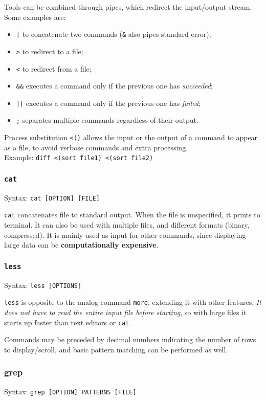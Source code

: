Tools can be combined through pipes, which redirect the input/output stream. Some examples are:
\begin{itemize}
	\item \texttt{|} to concatenate two commands (\texttt{\&} also pipes standard error);
	\item \texttt{>} to redirect to a file;
	\item \texttt{<} to redirect from a file;
	\item \texttt{\&\&} executes a command only if the previous one has \textit{succeeded};
	\item \texttt{||} executes a command only if the previous one has \textit{failed};
	\item \texttt{;} separates multiple commands regardless of their output.
\end{itemize}

Process substitution \texttt{<()} allows the input or the output of a command to appear as a file, to avoid verbose commands and extra processing. \\
Example: \texttt{diff <(sort file1) <(sort file2)}

\subsubsection{\texttt{cat}}
Syntax: \texttt{cat [OPTION] [FILE]}

\texttt{cat} concatenates file to standard output. When the file is unspecified, it prints to terminal. It can also be used with multiple files, and different formats (binary, compressed). It is mainly used as input for other commands, since displaying large data can be \textbf{computationally expensive}.

\subsubsection{\texttt{less}}
Syntax: \texttt{less [OPTIONS]}

\texttt{less} is opposite to the analog command \texttt{more}, extending it with other features. \textit{It does not have to read the entire input file before starting}, so with large files it starts up faster than text editors or \texttt{cat}. 

Commands may be preceded by decimal numbers indicating the number of rows to display/scroll, and basic pattern matching can be performed as well. 

\subsubsection{grep}
Syntax: \texttt{grep [OPTION] PATTERNS [FILE]}

